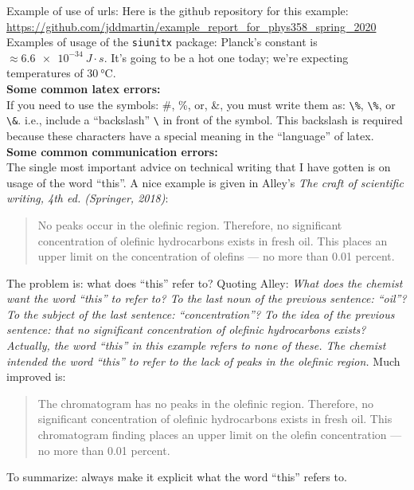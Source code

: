\documentclass[11pt,usenames,dvipsnames]{article}
\begin{document}
\noindent
Example of use of urls: Here is the github repository for this example:\\ \url{https://github.com/jddmartin/example_report_for_phys358_spring_2020}\\

\noindent
Examples of usage of the \verb$siunitx$ package: Planck's constant is $ \approx \SI{6.6e-34}{J \cdot s}$.  It's going to be a hot one today; we're expecting temperatures of $\SI{30}{\celsius}$.\\

\noindent
{\bf Some common latex errors:}\\

\noindent
If you need to use the symbols: \#, \%, or, \&, you must write them as: \verb$\%$, \verb$\%$, or \verb$\&$.  i.e., include a ``backslash'' \verb$\$ in front of the symbol.  This backslash is required because these characters have a special meaning in the ``language'' of latex.\\

\noindent
{\bf Some common communication errors:}\\

\noindent
The single most important advice on technical writing that I have gotten is on usage of the word ``this''.  A nice example is given in Alley's {\em The craft of scientific writing, 4th ed. (Springer, 2018)}:
\begin{quotation}
No peaks occur in the olefinic region. Therefore, no significant concentration of olefinic hydrocarbons exists in fresh oil. This places an upper limit on the concentration of olefins --- no more than 0.01 percent.
\end{quotation}
The problem is: what does ``this'' refer to?  Quoting Alley: \textit{What does the chemist want the word ``this'' to refer to? To the last noun of the previous sentence: ``oil''? To the subject of the last sentence: ``concentration''? To the idea of the previous sentence: that no significant concentration of olefinic hydrocarbons exists? Actually, the word ``this'' in this example refers to none of these. The chemist intended the word ``this'' to refer to the lack of peaks in the olefinic region.}
Much improved is:
\begin{quotation}
The chromatogram has no peaks in the olefinic region. Therefore, no significant concentration of olefinic hydrocarbons exists in fresh oil. This chromatogram finding places an upper limit on the olefin concentration --- no more than 0.01 percent.
\end{quotation}
To summarize: always make it explicit what the word ``this'' refers to.
\end{document}
